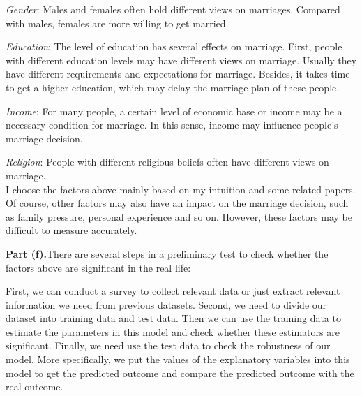 \documentclass[letterpaper,12pt]{article}
\theoremstyle{definition}
\begin{document}
\emph{Gender}: Males and females often hold different views on marriages. Compared with males, females are more willing to get married.

\emph{Education}: The level of education has several effects on marriage. First, people with different education levels may have different views on marriage. Usually they have different requirements and expectations for marriage. Besides, it takes time to get a higher education, which may delay the marriage plan of these people.

\emph{Income}: For many people, a certain level of economic base or income may be a necessary condition for marriage. In this sense, income may influence people’s marriage decision.

\emph{Religion}: People with different religious beliefs often have different views on marriage.\\
I choose the factors above mainly based on my intuition and some related papers. Of course, other factors may also have an impact on the marriage decision, such as family pressure, personal experience and so on. However, these factors may be difficult to measure accurately. 


\textbf{Part (f).}There are several steps in a preliminary test to check whether the factors above are significant in the real life:

First, we can conduct a survey to collect relevant data or just extract relevant information we need from previous datasets. Second, we need to divide our dataset into training data and test data. Then we can use the training data to estimate the parameters in this model and check whether these estimators are significant. Finally, we need use the test data to check the robustness of our model. More specifically, we put the values of the explanatory variables into this model to get the predicted outcome and compare the predicted outcome with the real outcome.
\end{document}
